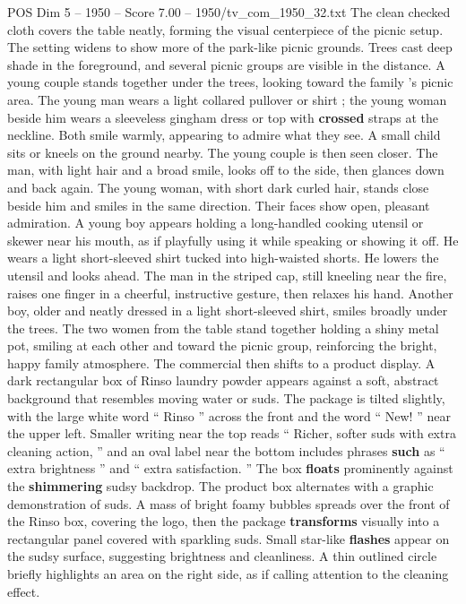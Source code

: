 \begin{textsample}{POS Dim 5 – 1950 – Score 7.00 – 1950/tv\_com\_1950\_32.txt}
The clean checked cloth covers the table neatly, forming the visual centerpiece of the picnic setup.
The setting widens to show more of the park-like picnic grounds.
Trees cast deep shade in the foreground, and several picnic groups are visible in the distance.
A young couple stands together under the trees, looking toward the family ’s picnic area.
The young man wears a light collared pullover or shirt ; the young woman beside him wears a sleeveless gingham dress or top with \textbf{crossed} straps at the neckline.
Both smile warmly, appearing to admire what they see.
A small child sits or kneels on the ground nearby.
The young couple is then seen closer.
The man, with light hair and a broad smile, looks off to the side, then glances down and back again.
The young woman, with short dark curled hair, stands close beside him and smiles in the same direction.
Their faces show open, pleasant admiration.
A young boy appears holding a long-handled cooking utensil or skewer near his mouth, as if playfully using it while speaking or showing it off.
He wears a light short-sleeved shirt tucked into high-waisted shorts.
He lowers the utensil and looks ahead.
The man in the striped cap, still kneeling near the fire, raises one finger in a cheerful, instructive gesture, then relaxes his hand.
Another boy, older and neatly dressed in a light short-sleeved shirt, smiles broadly under the trees.
The two women from the table stand together holding a shiny metal pot, smiling at each other and toward the picnic group, reinforcing the bright, happy family atmosphere.
The commercial then shifts to a product display.
A dark rectangular box of Rinso laundry powder appears against a soft, abstract background that resembles moving water or suds.
The package is tilted slightly, with the large white word “ Rinso ” across the front and the word “ New! ” near the upper left.
Smaller writing near the top reads “ Richer, softer suds with extra cleaning action, ” and an oval label near the bottom includes phrases \textbf{such} as “ extra brightness ” and “ extra satisfaction. ” The box \textbf{floats} prominently against the \textbf{shimmering} sudsy backdrop.
The product box alternates with a graphic demonstration of suds.
A mass of bright foamy bubbles spreads over the front of the Rinso box, covering the logo, then the package \textbf{transforms} visually into a rectangular panel covered with sparkling suds.
Small star-like \textbf{flashes} appear on the sudsy surface, suggesting brightness and cleanliness.
A thin outlined circle briefly highlights an area on the right side, as if calling attention to the cleaning effect.

\end{textsample}

